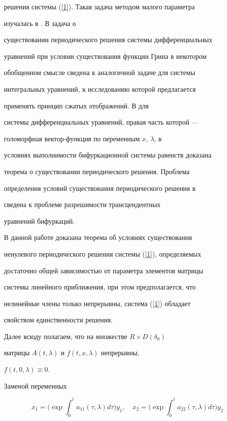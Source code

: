 решения системы (\ref{1}). Такая задача методом малого параметра


изучалась в \cite{Kaud}. В \cite{Shmidt} задача о


существовании периодического решения системы дифференциальных


уравнений при условии существования функции Грина в некотором


обобщенном смысле сведена к аналогичной задаче для системы


интегральных уравнений, к исследованию которой предлагается


применять принцип сжатых отображений. В \cite{Grudo} для


системы дифференциальных уравнений, правая часть которой ---


голоморфная вектор-функция по переменным $x$, $\lambda$, в


условиях выполнимости бифуркационной системы равенств доказана


теорема о существовании периодического решения. Проблема


определения условий существования периодического решения в


\cite{Hale} сведена к проблеме разрешимости трансцендентных


уравнений бифуркаций.





В данной работе доказана теорема об условиях существования


ненулевого периодического решения системы (\ref{1}), определяемых


достаточно общей зависимостью от параметра элементов матрицы


системы линейного приближения, при этом предполагается, что


нелинейные члены только непрерывны, система (\ref{1}) обладает


свойством единственности решения.





Далее всюду полагаем, что на множестве $R \times D({\delta_0})$


матрицы $A(t,\lambda)$ и $f(t,x,\lambda)$ непрерывны,


$f(t,0,\lambda) \equiv 0$.





Заменой переменных


\begin{equation}


\label{2}


x_1 =\bigg(\exp \int_0^t {a_{11} (\tau,\lambda)d\tau\bigg)y_1}, \quad


x_2 =\bigg(\exp \int_0^t {a_{22} (\tau,\lambda)d\tau\bigg)y_2} 


\end{equation}


